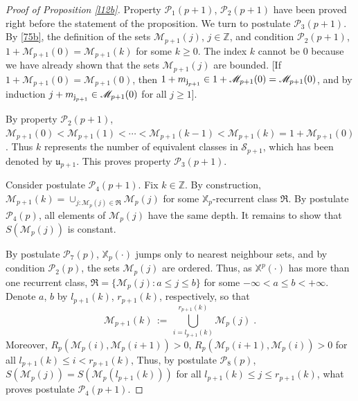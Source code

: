\documentclass[reqno]{amsart}
\theoremstyle{plain}
\theoremstyle{definition}
\newcommand{\mc}[1]{{\mathcal #1}}
\newcommand{\mf}[1]{{\mathfrak #1}}
\newcommand{\bb}[1]{{\mathbb #1}}
\newcommand{\ms}[1]{{\mathscr #1}}
\newcommand{\mss}[1]{{\textsf #1}}
\newcounter{as}[section]
\newcommand{\<}{\langle}
\renewcommand{\>}{\rangle}
\begin{document}
\begin{proof}[Proof of Proposition \ref{l12b}]
Property $\mc P_1(p+1)$, $\mc P_2(p+1)$ have been proved right before
the statement of the proposition.  We turn to postulate
$\mc P_3(p+1)$.  By \eqref{75b}, the definition of the sets
$\ms M_{p+1} (j)$, $j\in \bb Z$, and condition $\mc P_2(p+1)$,
$1 + \ms M_{p+1} (0) = \ms M_{p+1} (k)$ for some $k\ge 0$.  The index
$k$ cannot be $0$ because we have already shown that the sets
$\ms M_{p+1} (j)$ are bounded. [If
$1 + \ms M_{p+1} (0) = \ms M_{p+1} (0)$, then
$1+m_{\mss j_{p+1}} \in 1 + \ms M_{p+1} (0) = \ms M_{p+1} (0)$, and by
induction $j+m_{\mss j_{p+1}} \in \ms M_{p+1} (0)$ for all $j\ge 1$].

By property $\mc P_2(p+1)$, $\ms M_{p+1} (0) < \ms M_{p+1} (1) <
\cdots < \ms M_{p+1} (k-1) < \ms M_{p+1} (k) = 1 + \ms M_{p+1}
(0)$. Thus $k$ represents the number of equivalent classes in $\ms
S_{p+1}$, which has been denoted by $\mf u_{p+1}$. This proves
property $\mc P_3(p+1)$.

Consider postulate $\mc P_4(p+1)$.  Fix $k\in \bb Z$.  By
construction,
$\ms M_{p+1}(k) = \cup_{j : \ms M_{p}(j) \in \mf R} \ms M_{p}(j)$ for
some $\bb X_p$-recurrent class $\mf R$.  By postulate $\mc P_4(p)$,
all elements of $\ms M_{p}(j)$ have the same depth. It remains to show
that $S(\ms M_{p}(j))$ is constant.

By postulate $\mc P_7(p)$, $\bb X_p(\cdot)$ jumps only to nearest
neighbour sets, and by condition $\mc P_2(p)$, the sets $\ms M_p(j)$
are ordered. Thus, as $\bb X^p(\cdot)$ has more than one recurrent
class, $\mf R = \{ \ms M_{p}(j) : a\le j\le b\}$ for some
$-\infty<a\le b<+\infty$. Denote $a$, $b$ by $l_{p+1}(k)$,
$r_{p+1}(k)$, respectively, so that
\begin{equation}
\label{43}
\ms M_{p+1}(k) \,:=\, \bigcup_{i=l_{p+1}(k)}^{r_{p+1}(k)} \ms M_p(j) \;.
\end{equation}
Moreover, $R_p(\ms M_{p}(i), \ms M_{p}(i+1))>0$,
$R_p(\ms M_{p}(i+1), \ms M_{p}(i))>0$ for all
$l_{p+1}(k)\le i < r_{p+1}(k)$, Thus, by postulate $\mc P_8(p)$,
$S(\ms M_{p}(j)) = S(\ms M_{p}(l_{p+1}(k)))$ for all
$l_{p+1}(k)\le j\le r_{p+1}(k)$, what proves postulate $\mc P_4(p+1)$.
\end{proof}
\end{document}
